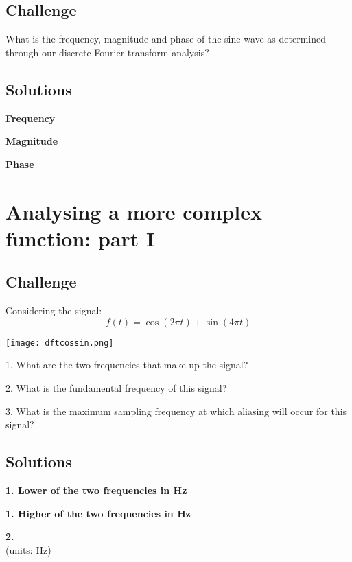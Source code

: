 \subsection*{Challenge}
What is the frequency, magnitude and phase of the sine-wave as determined through our discrete Fourier transform analysis?

\subsection*{Solutions}
\textbf{Frequency}\\

\textbf{Magnitude}\\

\textbf{Phase}




\newpage
\section{Analysing a more complex function: part I}

\subsection*{Challenge}
Considering the signal:
\begin{equation}
    f(t) = \cos(2 \pi t) + \sin(4 \pi t)
\end{equation}

\texttt{[image: dftcossin.png]}

1. What are the two frequencies that make up the signal?

2. What is the fundamental frequency of this signal?

3. What is the maximum sampling frequency at which aliasing will occur for this signal?

\subsection*{Solutions}
\textbf{1. Lower of the two frequencies in Hz}\\

\textbf{1. Higher of the two frequencies in Hz}\\

\textbf{2.}\\
(units: Hz)\\

